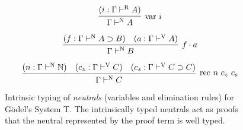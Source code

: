 \documentclass{llncs}
\def\arr{\supset}
\def\app{\cdot}
\def\nat{\mathbb{N}}
\newcommand{\turn}[1]{\vdash^\con{#1}}
\newcommand{\con}[1]{\textmd{#1}}
\newcommand{\fun}[1]{\textmd{#1}}
\newcommand{\typv}[1]{\Gamma \turn{V} #1}
\newcommand{\typn}[1]{\Gamma \turn{N} #1}
\newcommand{\typr}[1]{\Gamma \turn{R} #1}
\begin{document}
\begin{figure}
\caption{
Intrinsic typing of \textit{neutrals} (variables and elimination rules) 
for G{\"o}del's System T.
The intrinsically typed neutrals act as proofs that the neutral
represented by the proof term is well typed.
}

$$
\infer
  [\fun{var} ~ i]
  {\typn{A}}
{
  (i : \typr{A})
}
$$

$$
\infer
  [f \app a]
  {\typn{B}}
{
  (f : \typn{A \arr B})
  &
  (a : \typv{A})
}
$$

$$
\infer
  [\fun{rec} ~ n ~ c_z ~ c_s]
  {\typn{C}}
{
  (n : \typn{\nat})
  &
  (c_z : \typv{C})
  &
  (c_s : \typv{C \arr C})
}
$$
\label{fig:typn}
\end{figure}
\end{document}
